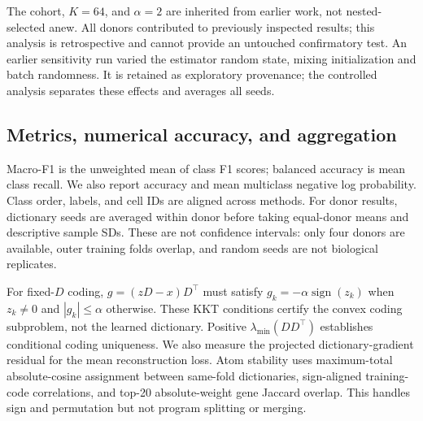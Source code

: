 The cohort, $K=64$, and $\alpha=2$ are inherited from earlier work, not
nested-selected anew. All donors contributed to previously inspected results;
this analysis is retrospective and cannot provide an untouched confirmatory
test. An earlier sensitivity run varied the estimator random state, mixing
initialization and batch randomness. It is retained as exploratory provenance;
the controlled analysis separates these effects and averages all seeds.

\subsection{Metrics, numerical accuracy, and aggregation}
Macro-F1 is the unweighted mean of class F1 scores; balanced accuracy is mean
class recall. We also report accuracy and mean multiclass negative log
probability. Class order, labels, and cell IDs are aligned across methods.
For donor results, dictionary seeds are averaged within donor before taking
equal-donor means and descriptive sample SDs. These are not confidence
intervals: only four donors are available, outer training folds overlap,
and random seeds are not biological replicates.

For fixed-$D$ coding, $g=(zD-x)D^\top$ must satisfy
$g_k=-\alpha\operatorname{sign}(z_k)$ when $z_k\ne0$ and
$|g_k|\le\alpha$ otherwise. These KKT conditions certify the convex coding
subproblem, not the learned dictionary. Positive
$\lambda_{\min}(DD^\top)$ establishes conditional coding uniqueness.
We also measure the projected dictionary-gradient residual for the mean
reconstruction loss. Atom stability uses maximum-total absolute-cosine
assignment between same-fold dictionaries, sign-aligned training-code
correlations, and top-20 absolute-weight gene Jaccard overlap. This handles
sign and permutation but not program splitting or merging.
